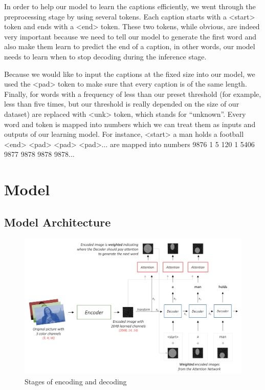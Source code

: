 \documentclass{article}
\begin{document}
In order to help our model to learn the captions efficiently, we went through the preprocessing stage by using several tokens. Each caption starts with a <start> token and ends with a <end> token. These two tokens, while obvious, are indeed very important because we need to tell our model to generate the first word and also make them learn to predict the end of a caption, in other words, our model needs to learn when to stop decoding during the inference stage. 

Because we would like to input the captions at the fixed size into our model, we used the  <pad> token to make sure that every caption is of the same length. Finally, for words with a frequency of less than our preset threshold (for example, less than five times, but our threshold is really depended on the size of our dataset) are replaced with <unk> token, which stands for “unknown”. Every word and token is mapped into numbers which we can treat them as inputs and outputs of our learning model. For instance, <start> a man holds a football <end> <pad> <pad> <pad>... are mapped into numbers 9876 1 5 120 1 5406 9877 9878 9878 9878...

\section{Model}

\subsection{Model Architecture}
\graphicspath{ {./images/} }
\begin{figure}[!htb]
    \centering
    \includegraphics[scale=0.5]{images/model.png}
    \caption{Stages of encoding and decoding}
    \label{fig:my_label}
\end{figure}
\end{document}
